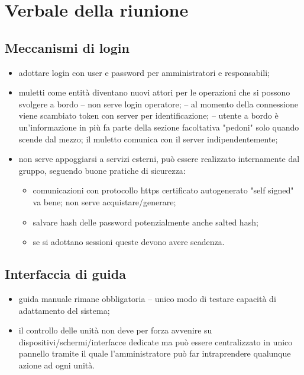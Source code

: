 \section{Verbale della riunione}

\subsection{Meccanismi di login}
\label{login}
    \begin{itemize}
        \item adottare login con user e password per amministratori e responsabili;
        \item muletti come entità diventano nuovi attori per le operazioni che si possono svolgere a bordo
            \subitem -- non serve login operatore;
            \subitem -- al momento della connessione viene scambiato token con server per identificazione;
            \subitem -- utente a bordo è un'informazione in più
                \subsubitem * fa parte della sezione facoltativa "pedoni" solo quando scende dal mezzo;
                \subsubitem * il muletto comunica con il server indipendentemente;
        \item non serve appoggiarsi a servizi esterni, può essere realizzato internamente dal gruppo, seguendo buone pratiche di sicurezza:
            \begin{itemize}
                \item comunicazioni con protocollo https
                    \subitem * certificato autogenerato "self signed" va bene;
                    \subitem * non serve acquistare/generare;
                \item salvare hash delle password
                    \subitem * potenzialmente anche salted hash;
                \item se si adottano sessioni queste devono avere scadenza.
            \end{itemize}
    \end{itemize}

\subsection{Interfaccia di guida}
    \begin{itemize}
        \item guida manuale rimane obbligatoria
            \subitem -- unico modo di testare capacità di adattamento del sistema;
        \item il controllo delle unità non deve per forza avvenire su dispositivi/schermi/interfacce dedicate ma può essere centralizzato in unico pannello tramite il quale l'amministratore può far intraprendere qualunque azione ad ogni unità.
    \end{itemize}


